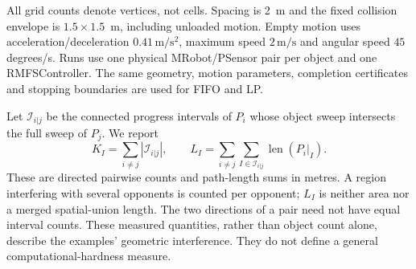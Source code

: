 \documentclass[11pt,a4paper]{article}
\theoremstyle{remark}
\begin{document}
All grid counts denote vertices, not cells. Spacing is 2~m and the fixed
collision envelope is $1.5\times1.5$~m, including unloaded motion. Empty
motion uses acceleration/deceleration $0.41\,\mathrm{m/s^2}$, maximum speed
$2\,\mathrm{m/s}$ and angular speed $45$ degrees/s. Runs use one physical
MRobot/PSensor pair per object and one RMFSController. The same geometry,
motion parameters, completion certificates and stopping boundaries are
used for FIFO and LP.

Let $\mathcal I_{i|j}$ be the connected progress intervals of $P_i$ whose
object sweep intersects the full sweep of $P_j$. We report
\begin{equation}
 K_I=\sum_{i\ne j}|\mathcal I_{i|j}|,\qquad
 L_I=\sum_{i\ne j}\sum_{I\in\mathcal I_{i|j}}\operatorname{len}(P_i|_I).
 \label{eq:validation-complexity}
\end{equation}
These are directed pairwise counts and path-length sums in metres.
A region interfering with several opponents is counted per opponent;
$L_I$ is neither area nor a merged spatial-union length. The two
directions of a pair need not have equal interval counts. These measured
quantities, rather than object count alone, describe the examples' geometric
interference. They do not define a general computational-hardness measure.
\end{document}

